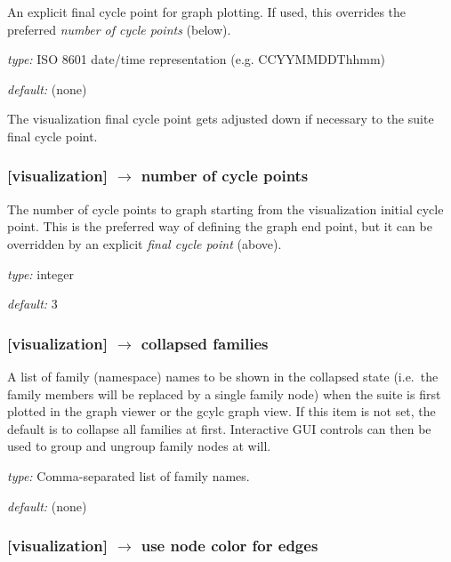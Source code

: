 An explicit final cycle point for graph plotting. If used, this overrides the
preferred {\em number of cycle points} (below).
\begin{myitemize}
    \item {\em type:} ISO 8601 date/time representation (e.g. CCYYMMDDThhmm)
    \item {\em default:} (none)
\end{myitemize}
The visualization final cycle point gets adjusted down if necessary to the
suite final cycle point.

\subsubsection[number of cycle points]{[visualization] $\rightarrow$ number of cycle points}

The number of cycle points to graph starting from the visualization initial
cycle point. This is the preferred way of defining the graph end point, but
it can be overridden by an explicit {\em final cycle point} (above).
\begin{myitemize}
    \item {\em type:} integer
    \item {\em default:} 3
\end{myitemize}

\subsubsection[collapsed families]{[visualization] $\rightarrow$ collapsed families}

A list of family (namespace) names to be shown in the collapsed state
(i.e.\ the family members will be replaced by a single family node) when
the suite is first plotted in the graph viewer or the gcylc graph view.
If this item is not set, the default is to collapse all families at first.
Interactive GUI controls can then be used to group and ungroup family
nodes at will.

\begin{myitemize}
    \item {\em type:} Comma-separated list of family names.
    \item {\em default:} (none)
\end{myitemize}

\subsubsection[use node color for edges]{[visualization] $\rightarrow$ use node color for edges}


